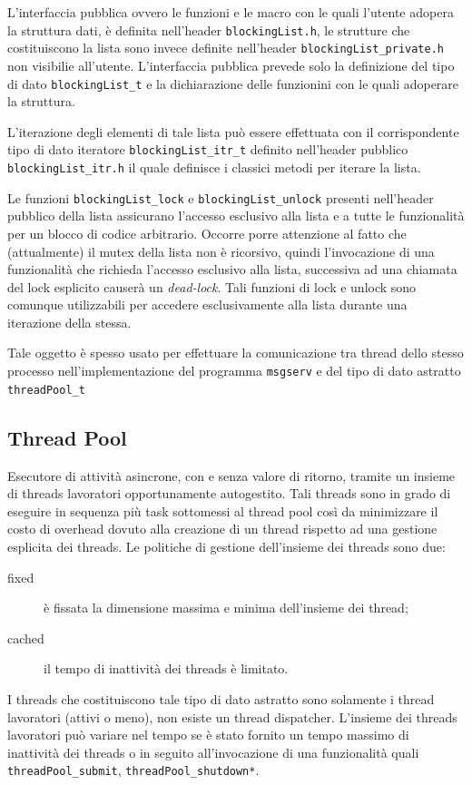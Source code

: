 \documentclass[a4paper,10pt]{article}
\begin{document}
L'interfaccia pubblica ovvero le funzioni e le macro con le quali
l'utente adopera la struttura dati, \`e definita nell'header
\texttt{blockingList.h}, le strutture che costituiscono la lista sono
invece definite nell'header \texttt{blockingList\_private.h} non
visibilie all'utente. L'interfaccia pubblica prevede solo la
definizione del tipo di dato \texttt{blockingList\_t} e la
dichiarazione delle funzionini con le quali adoperare la struttura.

L'iterazione degli elementi di tale lista pu\`o essere effettuata con
il corrispondente tipo di dato iteratore \texttt{blockingList\_itr\_t}
definito nell'header pubblico \texttt{blockingList\_itr.h} il quale
definisce i classici metodi per iterare la lista.

Le funzioni \texttt{blockingList\_lock} e
\texttt{blockingList\_unlock} presenti nell'header pubblico della
lista assicurano l'accesso esclusivo alla lista e a tutte le
funzionalit\`a per un blocco di codice arbitrario. Occorre porre
attenzione al fatto che (attualmente) il mutex della lista non \`e
ricorsivo, quindi l'invocazione di una funzionalit\`a che richieda
l'accesso esclusivo alla lista, successiva ad una chiamata del lock
esplicito causer\`a un \emph{dead-lock}. Tali funzioni di lock e
unlock sono comunque utilizzabili per accedere esclusivamente alla
lista durante una iterazione della stessa.

Tale oggetto \`e spesso usato per effettuare la comunicazione tra
thread dello stesso processo nell'implementazione del programma
\texttt{msgserv} e del tipo di dato astratto \texttt{threadPool\_t}

\subsection{Thread Pool}
Esecutore di attivit\`a asincrone, con e senza valore di ritorno,
tramite un insieme di threads lavoratori opportunamente
autogestito. Tali threads sono in grado di eseguire in sequenza pi\`u
task sottomessi al thread pool cos\`i da minimizzare il costo di
overhead dovuto alla creazione di un thread rispetto ad una gestione
esplicita dei threads. Le politiche di gestione dell'insieme dei
threads sono due:
\begin{description}
  \item[fixed] \`e fissata la dimensione massima e minima dell'insieme
    dei thread;
  \item[cached] il tempo di inattivit\`a dei threads \`e limitato.
\end{description}
I threads che costituiscono tale tipo di dato astratto sono solamente
i thread lavoratori (attivi o meno), non esiste un thread
dispatcher. L'insieme dei threads lavoratori pu\`o variare nel tempo
se \`e stato fornito un tempo massimo di inattivit\`a dei threads o in
seguito all'invocazione di una funzionalit\`a quali
\texttt{threadPool\_submit}, \texttt{threadPool\_shutdown*}. 
\end{document}
